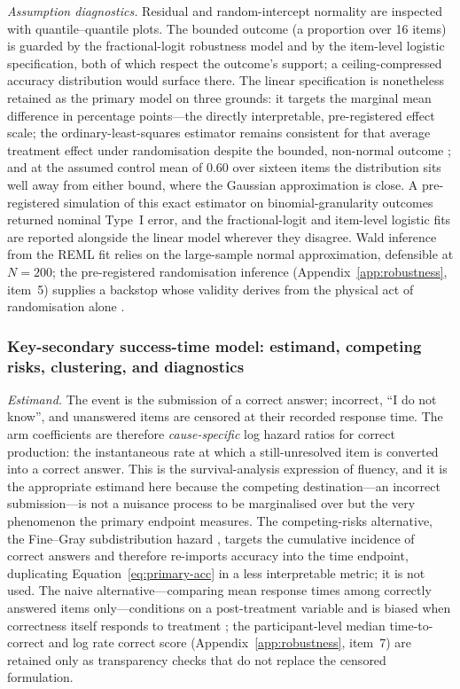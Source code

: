 \emph{Assumption diagnostics.} Residual and random-intercept normality are inspected with quantile--quantile plots. The bounded outcome (a proportion over 16 items) is guarded by the fractional-logit robustness model \parencite{papke1996} and by the item-level logistic specification, both of which respect the outcome's support; a ceiling-compressed accuracy distribution would surface there. The linear specification is nonetheless retained as the primary model on three grounds: it targets the marginal mean difference in percentage points---the directly interpretable, pre-registered effect scale; the ordinary-least-squares estimator remains consistent for that average treatment effect under randomisation despite the bounded, non-normal outcome \parencite{angrist2009}; and at the assumed control mean of $0.60$ over sixteen items the distribution sits well away from either bound, where the Gaussian approximation is close. A pre-registered simulation of this exact estimator on binomial-granularity outcomes returned nominal Type~I error, and the fractional-logit and item-level logistic fits are reported alongside the linear model wherever they disagree. Wald inference from the REML fit relies on the large-sample normal approximation, defensible at $N = 200$; the pre-registered randomisation inference (Appendix~\ref{app:robustness}, item~5) supplies a backstop whose validity derives from the physical act of randomisation alone \parencite{young2019}.

\subsubsection{Key-secondary success-time model: estimand, competing risks, clustering, and diagnostics}
\label{app:successtime-model}
\emph{Estimand.} The event is the submission of a correct answer; incorrect, ``I do not know'', and unanswered items are censored at their recorded response time. The arm coefficients are therefore \emph{cause-specific} log hazard ratios for correct production: the instantaneous rate at which a still-unresolved item is converted into a correct answer. This is the survival-analysis expression of fluency, and it is the appropriate estimand here because the competing destination---an incorrect submission---is not a nuisance process to be marginalised over but the very phenomenon the primary endpoint measures. The competing-risks alternative, the Fine--Gray subdistribution hazard \parencite{austin2016}, %
targets the cumulative incidence of correct answers and therefore re-imports accuracy into the time endpoint, duplicating Equation~\eqref{eq:primary-acc} in a less interpretable metric; it is not used. The naive alternative---comparing mean response times among correctly answered items only---conditions on a post-treatment variable and is biased when correctness itself responds to treatment \parencite{montgomery2018post}; the participant-level median time-to-correct and log rate correct score (Appendix~\ref{app:robustness}, item~7) are retained only as transparency checks that do not replace the censored formulation.

